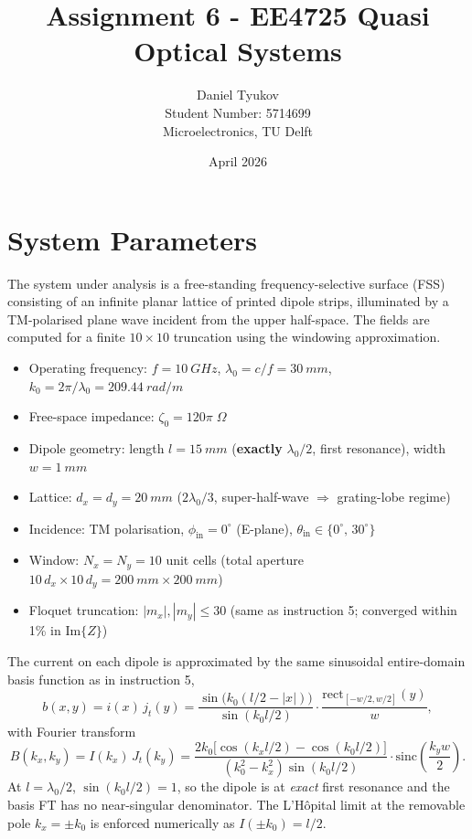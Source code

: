 \documentclass{article}
\title{Assignment 6 - EE4725 Quasi Optical Systems}
\author{Daniel Tyukov \\ Student Number: 5714699 \\ Microelectronics, TU Delft}
\date{April 2026}
\begin{document}
\maketitle

\tableofcontents
\newpage

\section{System Parameters}

The system under analysis is a free-standing frequency-selective surface (FSS) consisting of an infinite planar lattice of printed dipole strips, illuminated by a TM-polarised plane wave incident from the upper half-space. The fields are computed for a finite $10\times10$ truncation using the windowing approximation.

\begin{itemize}
\item Operating frequency: $f = \SI{10}{GHz}$, $\lambda_0 = c/f = \SI{30}{mm}$, $k_0 = 2\pi/\lambda_0 = \SI{209.44}{rad/m}$
\item Free-space impedance: $\zeta_0 = 120\pi\;\Omega$
\item Dipole geometry: length $l = \SI{15}{mm}$ (\textbf{exactly} $\lambda_0/2$, first resonance), width $w = \SI{1}{mm}$
\item Lattice: $d_x = d_y = \SI{20}{mm}$ ($2\lambda_0/3$, super-half-wave $\Rightarrow$ grating-lobe regime)
\item Incidence: TM polarisation, $\phi_{\text{in}} = 0^\circ$ (E-plane), $\theta_{\text{in}} \in \{0^\circ,\,30^\circ\}$
\item Window: $N_x = N_y = 10$ unit cells (total aperture $10\,d_x \times 10\,d_y = \SI{200}{mm}\times\SI{200}{mm}$)
\item Floquet truncation: $|m_x|, |m_y| \leq 30$ (same as instruction 5; converged within 1\% in Im$\{Z\}$)
\end{itemize}

The current on each dipole is approximated by the same sinusoidal entire-domain basis function as in instruction 5,
\begin{equation}\label{eq:basis}
b(x,y) = i(x)\,j_t(y) = \frac{\sin\!\big(k_0(l/2 - |x|)\big)}{\sin(k_0 l/2)}\cdot\frac{\mathrm{rect}_{[-w/2,w/2]}(y)}{w},
\end{equation}
with Fourier transform
\begin{equation}\label{eq:basis_FT}
B(k_x,k_y) = I(k_x)\,J_t(k_y) = \frac{2k_0\big[\cos(k_x l/2) - \cos(k_0 l/2)\big]}{(k_0^2 - k_x^2)\sin(k_0 l/2)}\cdot\mathrm{sinc}\!\left(\frac{k_y w}{2}\right).
\end{equation}
At $l = \lambda_0/2$, $\sin(k_0 l/2) = 1$, so the dipole is at \emph{exact} first resonance and the basis FT has no near-singular denominator. The L'H\^opital limit at the removable pole $k_x = \pm k_0$ is enforced numerically as $I(\pm k_0) = l/2$.
\end{document}
